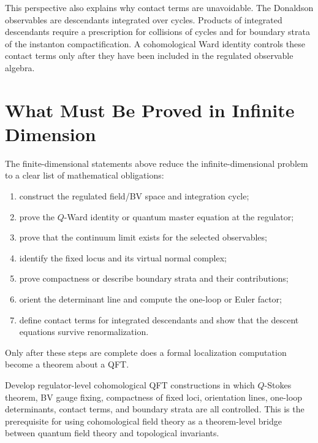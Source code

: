 This perspective also explains why contact terms are unavoidable.  The
Donaldson observables are descendants integrated over cycles.  Products of
integrated descendants require a prescription for collisions of cycles and
for boundary strata of the instanton compactification.  A cohomological Ward
identity controls these contact terms only after they have been included in
the regulated observable algebra.

\section{What Must Be Proved in Infinite Dimension}

The finite-dimensional statements above reduce the infinite-dimensional
problem to a clear list of mathematical obligations:
\begin{enumerate}[label=(\roman*)]
\item construct the regulated field/BV space and integration cycle;
\item prove the \(Q\)-Ward identity or quantum master equation at the
  regulator;
\item prove that the continuum limit exists for the selected observables;
\item identify the fixed locus and its virtual normal complex;
\item prove compactness or describe boundary strata and their contributions;
\item orient the determinant line and compute the one-loop or Euler factor;
\item define contact terms for integrated descendants and show that the
  descent equations survive renormalization.
\end{enumerate}
Only after these steps are complete does a formal localization computation
become a theorem about a QFT.

\begin{openproblem}
\label{op:cohomological-qft-beyond-formal-localization}
Develop regulator-level cohomological QFT constructions in which \(Q\)-Stokes
theorem, BV gauge fixing, compactness of fixed loci, orientation lines,
one-loop determinants, contact terms, and boundary strata are all controlled.
This is the prerequisite for using cohomological field theory as a
theorem-level bridge between quantum field theory and topological invariants.
\end{openproblem}

